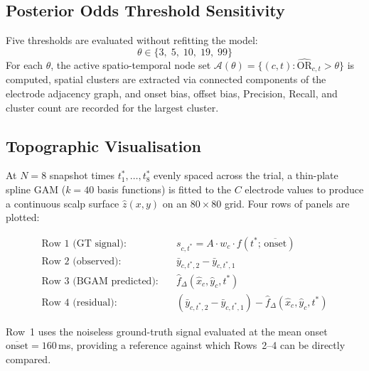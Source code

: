 \documentclass[12pt, a4paper]{article}
\begin{document}
\subsection{Posterior Odds Threshold Sensitivity}\label{sec:theta_sens}

Five thresholds are evaluated without refitting the model:
\begin{equation}
  \theta \in \{3,\;5,\;10,\;19,\;99\}
\end{equation}
For each $\theta$, the active spatio-temporal node set
$\mathcal{A}(\theta) = \{(c,t): \widehat{\mathrm{OR}}_{c,t} > \theta\}$
is computed, spatial clusters are extracted via connected components of the
electrode adjacency graph, and onset bias, offset bias, Precision, Recall,
and cluster count are recorded for the largest cluster.

\subsection{Topographic Visualisation}\label{sec:topo}

At $N = 8$ snapshot times $t_1^*,\ldots,t_8^*$ evenly spaced across the
trial, a thin-plate spline GAM ($k = 40$ basis functions) is fitted to
the $C$ electrode values to produce a continuous scalp surface
$\hat{z}(x,y)$ on an $80\times 80$ grid.
Four rows of panels are plotted:

\begin{equation}\label{eq:topo_rows}
\begin{aligned}
  \text{Row 1 (GT signal):}   &\quad
    s_{c,t^*} = A\cdot w_c \cdot f(t^*;\,\overline{\mathrm{onset}})\\
  \text{Row 2 (observed):}    &\quad
    \bar{y}_{c,t^*,2} - \bar{y}_{c,t^*,1}\\
  \text{Row 3 (BGAM predicted):} &\quad
    \hat{f}_\Delta(\hat{x}_c,\hat{y}_c,t^*)\\
  \text{Row 4 (residual):}    &\quad
    (\bar{y}_{c,t^*,2} - \bar{y}_{c,t^*,1})
    - \hat{f}_\Delta(\hat{x}_c,\hat{y}_c,t^*)
\end{aligned}
\end{equation}

Row~1 uses the noiseless ground-truth signal evaluated at the mean onset
$\overline{\mathrm{onset}} = 160$\,ms, providing a reference against which
Rows~2--4 can be directly compared.
\end{document}
